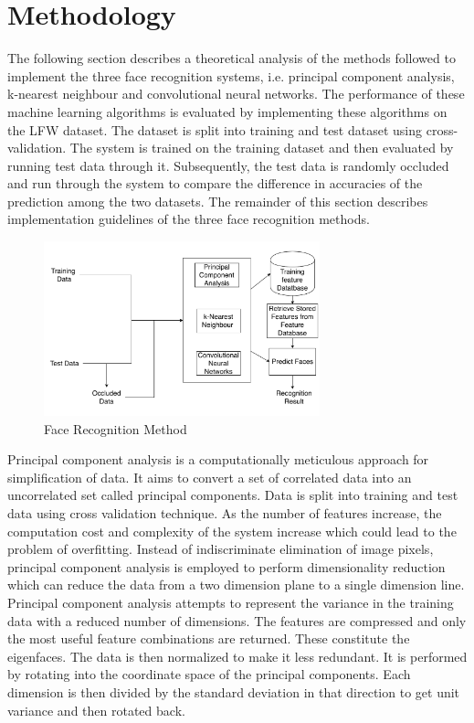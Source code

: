 \documentclass[conference]{IEEEtran}
\begin{document}
\section{Methodology}
\label{sec:3 Methodology} 
The following section describes a theoretical analysis of the methods followed to implement the three face recognition systems, i.e. principal component analysis, k-nearest neighbour and convolutional neural networks. The performance of these machine learning algorithms is evaluated by implementing these algorithms on the LFW dataset. The dataset is split into training and test dataset using cross-validation. The system is trained on the training dataset and then evaluated by running test data through it. Subsequently, the test data is randomly occluded and run through the system to compare the difference in accuracies of the prediction among the two datasets. The remainder of this section describes implementation guidelines of the three face recognition methods.

\begin{figure}[h!]

 \centering
 \includegraphics[width = 8cm]{methodology1.pdf}
 \caption{ Face Recognition Method} 
 \label{fig 1: methodology}
\end{figure}

Principal component analysis is a computationally meticulous approach for simplification of data. It aims to convert a set of correlated data into an uncorrelated set called principal components\cite{turk1991face}. Data is split into training and test data using cross validation technique. As the number of features increase, the computation cost and complexity of the system increase which could lead to the problem of overfitting. Instead of indiscriminate elimination of image pixels, principal component analysis is employed to perform dimensionality reduction which can reduce the data from a two dimension plane to a single dimension line. Principal component analysis  attempts to represent the variance in the training data with a reduced number of dimensions. The features are compressed and only the most useful feature combinations are returned. These constitute the eigenfaces. The data is then normalized to make it less redundant. It is performed by rotating into the coordinate space of the principal components. Each dimension is then divided by the standard deviation in that direction to get unit variance and then rotated back. 
\end{document}
